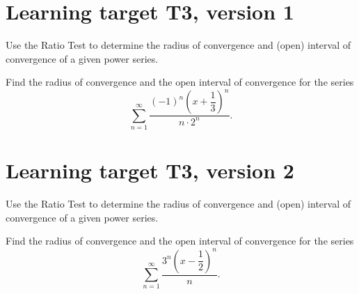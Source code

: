 




\everymath{\displaystyle}

\section{Learning target T3, version 1}

Use the Ratio Test to determine the radius of convergence and (open) interval of convergence of a given power series.

\hrulefill


Find the radius of convergence and the open interval of convergence for the series
\[\sum_{n=1}^\infty \dfrac{(-1)^n \left(x+\dfrac13\right)^n}{n \cdot 2^n}.\]

\pagebreak
\section{Learning target T3, version 2}

Use the Ratio Test to determine the radius of convergence and (open) interval of convergence of a given power series.

\hrulefill

Find the radius of convergence and the open interval of convergence for the series
\[\sum_{n=1}^\infty \dfrac{3^n \left(x-\dfrac12\right)^n}{n}.\]


